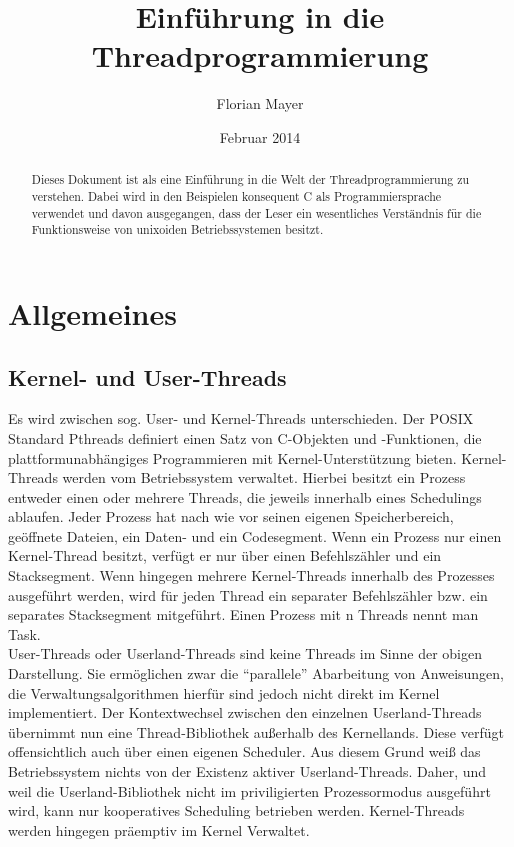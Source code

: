\documentclass[11pt,a4paper]{article}
\begin{document}
\title{\color{black}Einführung in die Threadprogrammierung}
\author{\color{darkblue}Florian Mayer}
\date{\color{lightblue}Februar 2014}
\maketitle

\begin{abstract}
Dieses Dokument ist als eine Einführung in die Welt der Threadprogrammierung zu verstehen. Dabei wird in den Beispielen konsequent C als Programmiersprache verwendet und davon ausgegangen, dass der Leser ein wesentliches Verständnis für die Funktionsweise von unixoiden Betriebssystemen besitzt. 
\end{abstract}

\tableofcontents




\section{Allgemeines}
\subsection{Kernel- und User-Threads}
Es wird zwischen sog. User- und Kernel-Threads unterschieden. 
Der POSIX Standard Pthreads definiert einen Satz von C-Objekten und -Funktionen, die plattformunabhängiges Programmieren mit Kernel-Unterstützung bieten. Kernel-Threads werden vom Betriebssystem verwaltet. Hierbei besitzt ein Prozess entweder einen oder mehrere Threads, die jeweils innerhalb eines Schedulings ablaufen. Jeder Prozess hat nach wie vor seinen eigenen Speicherbereich, geöffnete Dateien, ein Daten- und ein Codesegment. Wenn ein Prozess nur einen Kernel-Thread besitzt, verfügt er nur über einen Befehlszähler und ein Stacksegment. Wenn hingegen mehrere Kernel-Threads innerhalb des Prozesses ausgeführt werden, wird für jeden Thread ein separater Befehlszähler bzw. ein separates Stacksegment mitgeführt. Einen Prozess mit n Threads nennt man Task. \\ 
User-Threads oder Userland-Threads sind keine Threads im Sinne der obigen Darstellung. Sie ermöglichen zwar die ``parallele'' Abarbeitung von Anweisungen, die Verwaltungsalgorithmen hierfür sind jedoch nicht direkt im Kernel implementiert. Der Kontextwechsel zwischen den einzelnen Userland-Threads übernimmt nun eine Thread-Bibliothek außerhalb des Kernellands. Diese verfügt offensichtlich auch über einen eigenen Scheduler. Aus diesem Grund weiß das Betriebssystem nichts von der Existenz aktiver Userland-Threads. Daher, und weil die Userland-Bibliothek nicht im priviligierten Prozessormodus ausgeführt wird, kann nur kooperatives Scheduling betrieben werden. Kernel-Threads werden hingegen präemptiv im Kernel Verwaltet.
\end{document}
